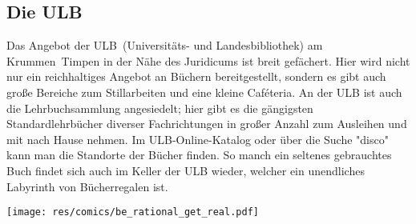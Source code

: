 \begin{multicols*}{2}
\subsection{Die ULB}
Das Angebot der ULB~(Universitäts- und Landesbibliothek) am Krummen~Timpen in der Nähe des Juridicums ist breit gefächert.
Hier wird nicht nur ein reichhaltiges Angebot an Büchern bereitgestellt, sondern es gibt auch große Bereiche zum Stillarbeiten und eine kleine Caféteria.
An der ULB ist auch die Lehrbuchsammlung angesiedelt; hier gibt es die gängigsten Standardlehrbücher diverser Fachrichtungen in großer Anzahl zum Ausleihen und mit nach Hause nehmen.
Im ULB-Online-Katalog oder über die Suche "disco" kann man die Standorte der Bücher finden.
So manch ein seltenes gebrauchtes Buch findet sich auch im Keller der ULB wieder, welcher ein unendliches Labyrinth von Bücherregalen ist.

\begin{center}
	\texttt{[image: res/comics/be\_rational\_get\_real.pdf]}
\end{center}

\end{multicols*}
